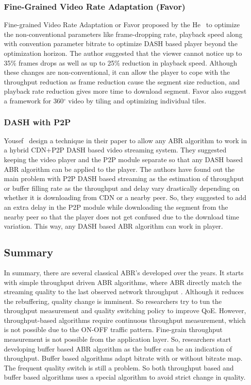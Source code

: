 \subsubsection{Fine-Grained Video Rate Adaptation (Favor)}
Fine-grained Video Rate Adaptation or Favor\cite{10.1145/3204949.3204957} proposed by the He \etal\ to optimize the non-conventional parameters like frame-dropping rate, playback speed along with convention parameter bitrate to optimize DASH based player beyond the optimization horizon. The author suggested that the viewer cannot notice up to 35\% frames drops as well as up to 25\% reduction in playback speed. Although these changes are non-conventional, it can allow the player to cope with the throughput reduction as frame reduction cause the segment size reduction, and playback rate reduction gives more time to download segment. Favor also suggest a framework for 360$^{\circ}$ video by tiling and optimizing individual tiles.

\subsubsection{DASH with P2P}
Yousef \etal\ design a technique in their paper \cite{10.1145/3339825.3391859} to allow any ABR algorithm to work in a hybrid CDN+P2P DASH based video streaming system. They suggested keeping the video player and the P2P module separate so that any DASH based ABR algorithm can be applied to the player. The authors have found out the main problem with P2P DASH based streaming as the estimation of throughput or buffer filling rate as the throughput and delay vary drastically depending on whether it is downloading from CDN or a nearby peer. So, they suggested to add an extra delay in the P2P module while downloading the segment from the nearby peer so that the player does not get confused due to the download time variation. This way, any DASH based ABR algorithm can work in player.

\subsection{Summary}
In summary, there are several classical ABR's developed over the years. It starts with simple throughput driven ABR algorithms, where ABR directly match the streaming quality to the last observed network throughput \cite{5677508,10.1145/1943552.1943575,10.1145/1943552.1943574}. Although it reduces the rebuffering, quality change is imminent. So researchers try to tun the throughput measurement and quality switching policy to improve QoE. However, throughput-based algorithms require continuous throughput measurement, which is not possible due to the ON-OFF traffic pattern. Fine-grain throughput measurement is not possible from the application layer. So, researchers start developing buffer based ABR algorithm as the buffer can be an indication of throughput. Buffer based algorithms adapt bitrate with or without bitrate map. The frequent quality switch is still a problem. So both throughput based and buffer based algorithms uses a special algorithm to avoid strict change in quality.

